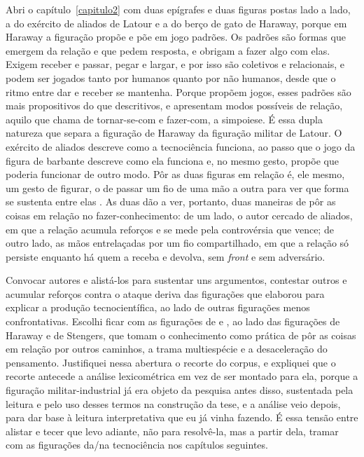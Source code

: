 Abri o capítulo~\ref{capitulo2} com duas epígrafes e duas figuras postas lado a lado, a do exército de aliados de Latour e a do berço de gato de Haraway, porque em Haraway a figuração propõe e põe em jogo padrões. Os padrões são formas que emergem da relação e que pedem resposta, e obrigam a fazer algo com elas. Exigem receber e passar, pegar e largar, e por isso são coletivos e relacionais, e podem ser jogados tanto por humanos quanto por não humanos, desde que o ritmo entre dar e receber se mantenha. Porque propõem jogos, esses padrões são mais propositivos do que descritivos, e apresentam modos possíveis de relação, aquilo que \textcite{Haraway2023Ficar} chama de tornar-se-com e fazer-com, a simpoiese. É essa dupla natureza que separa a figuração de Haraway da figuração militar de Latour. O exército de aliados descreve como a tecnociência funciona, ao passo que o jogo da figura de barbante descreve como ela funciona e, no mesmo gesto, propõe que poderia funcionar de outro modo. Pôr as duas figuras em relação é, ele mesmo, um gesto de figurar, o de passar um fio de uma mão a outra para ver que forma se sustenta entre elas \parencite[p.~25]{Haraway2023Ficar}. As duas dão a ver, portanto, duas maneiras de pôr as coisas em relação no fazer-conhecimento: de um lado, o autor cercado de aliados, em que a relação acumula reforços e se mede pela controvérsia que vence; de outro lado, as mãos entrelaçadas por um fio compartilhado, em que a relação só persiste enquanto há quem a receba e devolva, sem \textit{front} e sem adversário.

Convocar autores e alistá-los para sustentar uns argumentos, contestar outros e acumular reforços contra o ataque deriva das figurações que \textcite[cap.~1]{Latour2011CienciaEmAcao} elaborou para explicar a produção tecnocientífica, ao lado de outras figurações menos confrontativas. Escolhi ficar com as figurações de \textcite{latour_woolgar_1986_lab_life} e \textcite{latour1996clarifications, Latour1999RecallingANT, Latour1987Science, Latour1999PandorasHope, Latour2013Inquiry}, ao lado das figurações de Haraway e de Stengers, que tomam o conhecimento como prática de pôr as coisas em relação por outros caminhos, a trama multiespécie e a desaceleração do pensamento. Justifiquei nessa abertura o recorte do corpus, e expliquei que o recorte antecede a análise lexicométrica em vez de ser montado para ela, porque a figuração militar-industrial já era objeto da pesquisa antes disso, sustentada pela leitura e pelo uso desses termos na construção da tese, e a análise veio depois, para dar base à leitura interpretativa que eu já vinha fazendo. É essa tensão entre alistar e tecer que levo adiante, não para resolvê-la, mas a partir dela, tramar com as figurações da/na tecnociência nos capítulos seguintes.


